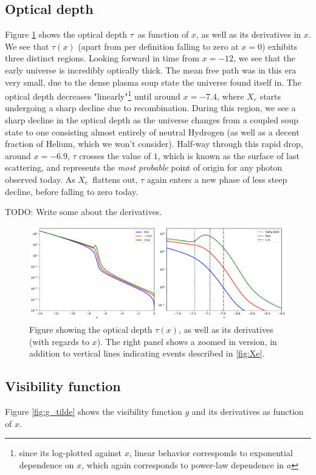 \documentclass[10pt, a4paper]{article}
\begin{document}
\subsection{Optical depth}
Figure \ref{fig:tau} shows the optical depth $\tau$ as function of $x$, as well as its derivatives in $x$. We see that $\tau(x)$ (apart from per definition falling to zero at $x=0$) exhibits three distinct regions. Looking forward in time from $x=-12$, we see that the early universe is incredibly optically thick. The mean free path was in this era very small, due to the dense plasma soup state the universe found itself in. The optical depth decreases "linearly"\footnote{since its log-plotted against $x$, linear behavior corresponds to exponential dependence on $x$, which again corresponds to power-law dependence in $a$} until around $x=-7.4$, where $X_e$ starts undergoing a sharp decline due to recombination. During this region, we see a sharp decline in the optical depth as the universe changes from a coupled soup state to one consisting almost entirely of neutral Hydrogen (as well as a decent fraction of Helium, which we won't consider). Half-way through this rapid drop, around $x=-6.9$, $\tau$ crosses the value of $1$, which is known as the surface of last scattering, and represents the \textit{most probable} point of origin for any photon observed today. As $X_e$ flattens out, $\tau$ again enters a new phase of less steep decline, before falling to zero today.

TODO: Write some about the derivatives.


\begin{figure}[H]
    \centering
    \includegraphics[scale=0.5]{../m2_figs/tau.pdf}
    \caption{Figure showing the optical depth $\tau(x)$, as well as its derivatives (with regards to $x$). The right panel shows a zoomed in version, in addition to vertical lines indicating events described in \ref{fig:Xe}.}
    \label{fig:tau}
\end{figure}


\subsection{Visibility function}\label{sec:results:g_tilde}
Figure \ref{fig:g_tilde} shows the visibility function $g$ and its derivatives as function of $x$. 
\end{document}
